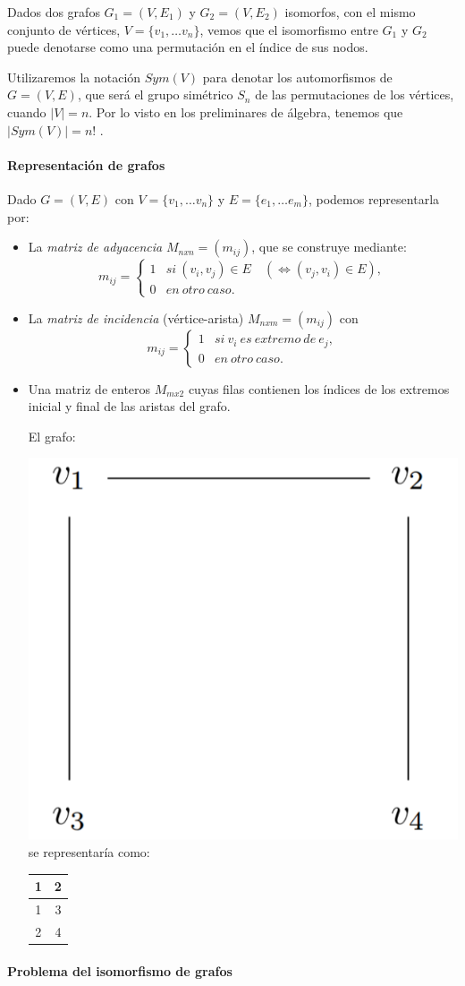 \hfil

Dados dos grafos $G_1 = (V, E_1)$ y $G_2 = (V, E_2)$ isomorfos, con el mismo conjunto de vértices, $V=\{v_1,\dots v_n\}$, vemos que el isomorfismo entre $G_1$ y $G_2$ puede denotarse como una permutación en el índice de sus nodos.

Utilizaremos la notación $Sym(V)$ para denotar los automorfismos de $G=(V,E)$, que será el grupo simétrico $S_n$ de las permutaciones de los vértices, cuando $\mid V \mid=n$. Por lo visto en los preliminares de álgebra, tenemos que $\mid Sym(V) \mid = n!$ .


\hfil

\paragraph{Representación de grafos}

\hfil

Dado $G=(V,E)$ con $V=\{v_1,\dots v_n\}$ y $E=\{e_1,\dots e_m\}$, podemos representarla por:

\begin{itemize}
	\item  La \textit{matriz de adyacencia} $M_{nxn} = (m_{ij})$, que se construye mediante:
	\[
		m_{ij} =
		\begin{cases}
		1 & si\ (v_i,v_j) \in E \quad ( \Leftrightarrow (v_j,v_i)\in E ), \\
		0 & en\ otro\ caso.
		\end{cases}
	\]
	
	\item La \textit{matriz de incidencia} (vértice-arista) $M_{nxm} = (m_{ij})$ con
	\[
	m_{ij} =
	\begin{cases}
	1 & si\ v_i\ es\ extremo\ de\ e_j, \\
	0 & en\ otro\ caso.
	\end{cases}
	\]
	
	\item Una matriz de enteros $M_{mx2}$ cuyas filas contienen los índices de los extremos inicial y final de las aristas del grafo.
	
	\begin{example}
		El grafo:
		
		\includegraphics[width=.2\linewidth]{gfx/exgraph}
		\qquad se representaría como: \qquad
		\begin{tabular}{|c|c|}
			\hline	1 & 2 \\ \hline 1 & 3 \\ \hline 2 & 4 \\ \hline
		\end{tabular}	
	
	\end{example}
	
\end{itemize}


\hfil


\paragraph{Problema del isomorfismo de grafos}

